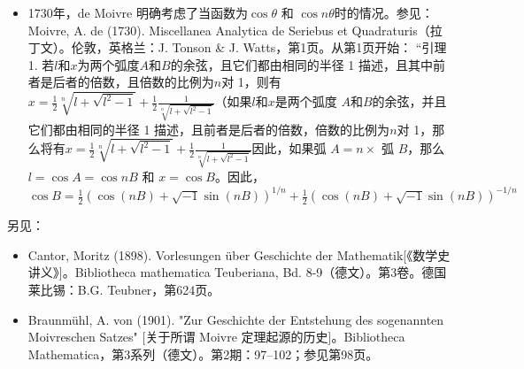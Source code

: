 \begin{enumerate}
\begin{itemize}
\item 1730年，de Moivre 明确考虑了当函数为\( \cos \theta \) 和 \( \cos n\theta \)时的情况。参见：Moivre, A. de (1730). Miscellanea Analytica de Seriebus et Quadraturis（拉丁文）。伦敦，英格兰：J. Tonson & J. Watts，第1页。从第1页开始：  
“引理 1. 若\( l \)和\( x \)为两个弧度\( A \)和\( B \)的余弦，且它们都由相同的半径 1 描述，且其中前者是后者的倍数，且倍数的比例为\( n \)对 1，则有\(x = \frac{1}{2} \sqrt[n]{l + \sqrt{l^2 - 1}} + \frac{1}{2} \frac{1}{\sqrt[n]{l + \sqrt{l^2 - 1}}}\)（如果\( l \)和\( x \)是两个弧度 \( A \)和\( B \)的余弦，并且它们都由相同的半径 1 描述，且前者是后者的倍数，倍数的比例为\( n \)对 1，那么将有\(x = \frac{1}{2} \sqrt[n]{l + \sqrt{l^2 - 1}} + \frac{1}{2} \frac{1}{\sqrt[n]{l + \sqrt{l^2 - 1}}}\)因此，如果弧 \( A = n \times \) 弧 \( B \)，那么 \( l = \cos A = \cos nB \) 和 \( x = \cos B \)。因此，\(\cos B = \frac{1}{2} \left( \cos(nB) + \sqrt{-1} \sin(nB) \right)^{1/n} + \frac{1}{2} \left( \cos(nB) + \sqrt{-1} \sin(nB) \right)^{-1/n}\)
\end{itemize}
另见：  
\begin{itemize}
\item Cantor, Moritz (1898). Vorlesungen über Geschichte der Mathematik[《数学史讲义》]。Bibliotheca mathematica Teuberiana, Bd. 8-9（德文）。第3卷。德国莱比锡：B.G. Teubner，第624页。  
\item Braunmühl, A. von (1901). "Zur Geschichte der Entstehung des sogenannten Moivreschen Satzes" [关于所谓 Moivre 定理起源的历史]。Bibliotheca Mathematica，第3系列（德文）。第2期：97–102；参见第98页。
\end{itemize}
\end{enumerate}